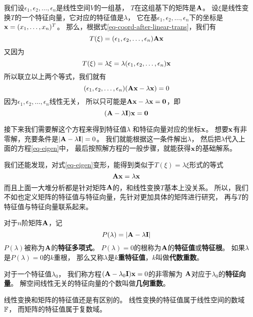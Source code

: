 我们设$\epsilon_1,\epsilon_2,\dots,\epsilon_n$是线性空间$V$的一组基，
$T$在这组基下的矩阵是$\mathbf{A}$。
设$\xi$是线性变换$T$的一个特征向量，它对应的特征值是$\lambda$，
它在基$\epsilon_1,\epsilon_2,\dots,\epsilon_n$下的坐标是
$\mathbf{x}=(x_1,\dots,x_n)^T$。
那么，根据式\ref{eq-coord-after-linear-trans}，我们有
\[ T(\xi) = (\epsilon_1,\epsilon_2,\dots,\epsilon_n)\mathbf{A}\mathbf{x} \]
又因为
\[ T(\xi) = \lambda\xi = \lambda(\epsilon_1,\epsilon_2,\dots,\epsilon_n)\mathbf{x} \]
所以联立以上两个等式，我们就有
\begin{displaymath}
  (\epsilon_1,\epsilon_2,\dots,\epsilon_n)(\mathbf{A}\mathbf{x} - \lambda\mathbf{x})=0
\end{displaymath}
因为$\epsilon_1,\epsilon_2,\dots,\epsilon_n$线性无关，
所以只可能是$\mathbf{A}\mathbf{x} - \lambda\mathbf{x} = \mathbf{0}$，即
\begin{equation} \label{eq-eigen}
  (\mathbf{A} - \lambda\mathbf{I})\mathbf{x} = \mathbf{0}
\end{equation}

接下来我们需要解这个方程来得到特征值$\lambda$
和特征向量对应的坐标$\mathbf{x}$。
想要$\mathbf{x}$有非零解，充要条件是$|\mathbf{A} - \lambda\mathbf{I}| = 0$。
我们就能根据这一条件解出$\lambda$，
然后把$\lambda$代入上面的方程\ref{eq-eigen}中，
最后按照解方程的一般步骤，就能获得$\mathbf{x}$的基础解系。

我们还能发现，对式\ref{eq-eigen}变形，能得到类似于$T(\xi)=\lambda\xi$形式的等式
\begin{displaymath}
\mathbf{A}\mathbf{x}=\lambda\mathbf{x}
\end{displaymath}
而且上面一大堆分析都是针对矩阵$\mathbf{A}$的，和线性变换$T$基本上没关系。
所以，我们不如也定义矩阵的特征值与特征向量，先针对更加具体的矩阵进行研究，
再与$T$的特征值与特征向量联系起来。

\begin{definition}[矩阵的特征值和特征向量]
  对于$n$阶矩阵$\mathbf{A}$，记
  \[P(\lambda)=|\mathbf{A}-\lambda\mathbf{I}|\]
  $P(\lambda)$被称为$\mathbf{A}$的\textbf{特征多项式}。
  $P(\lambda)=0$的根称为$\mathbf{A}$的\textbf{特征值}或\textbf{特征根}。
  如果$\lambda$是$P(\lambda)=0$的$k$重根，
  那么又称$\lambda$是\textbf{$k$重特征值}，$k$叫做\textbf{代数重数}。
  
  对于一个特征值$\lambda_0$，
  我们称方程$(\mathbf{A}-\lambda_0\mathbf{I})\mathbf{x}=0$的非零解为
  $\mathbf{A}$对应于$\lambda_0$的\textbf{特征向量}。
  解空间线性无关的特征向量的个数叫做\textbf{几何重数}。
\end{definition}

\begin{remark}
  线性变换和矩阵的特征值还是有区别的。
  线性变换的特征值属于线性空间的数域$\mathbb{F}$，
  而矩阵的特征值属于复数域。
\end{remark}

